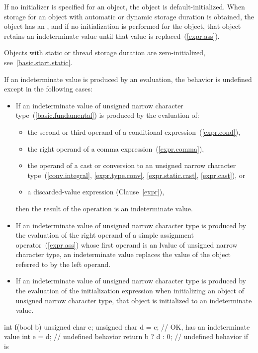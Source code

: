 \pnum
{}%
%
If no initializer is specified for an object, the object is default-initialized.
When storage for an object with automatic or dynamic storage duration
is obtained, the object has an , and if
no initialization is performed for the object, that object retains an
indeterminate value until that value is replaced~(\ref{expr.ass}).
\begin{note} Objects with static or thread storage duration are zero-initialized,
see~\ref{basic.start.static}. \end{note}
If an indeterminate value is produced by an evaluation, the behavior is
undefined except in the following cases:

\begin{itemize}
\item
If an indeterminate value of unsigned narrow character
type~(\ref{basic.fundamental}) is produced by the evaluation of:
\begin{itemize}
\item the second or third operand of a conditional expression~(\ref{expr.cond}),
\item the right operand of a comma expression~(\ref{expr.comma}),
\item the operand of a cast or conversion to an unsigned narrow character
type~(\ref{conv.integral}, \ref{expr.type.conv}, \ref{expr.static.cast},
\ref{expr.cast}), or
\item a discarded-value expression (Clause~\ref{expr}),
\end{itemize}
then the result of the operation is an indeterminate value.

\item
If an indeterminate value of unsigned narrow character
type is produced by the evaluation of the right
operand of a simple assignment operator~(\ref{expr.ass}) whose first operand
is an lvalue of unsigned narrow character type, an indeterminate value replaces
the value of the object referred to by the left operand.

\item
If an indeterminate value of unsigned narrow character type is produced by the
evaluation of the initialization expression when initializing an object of
unsigned narrow character type, that object is initialized to an indeterminate
value.
\end{itemize}
\begin{example}
\begin{codeblock}
  int f(bool b) {
    unsigned char c;
    unsigned char d = c; // OK,  has an indeterminate value
    int e = d;           // undefined behavior
    return b ? d : 0;    // undefined behavior if  is 
  }
\end{codeblock}
\end{example}

